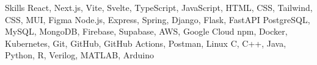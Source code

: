 
\begin{rubric}{Skills}
    React, Next.js, Vite, Svelte, TypeScript, JavaScript, HTML, CSS, Tailwind, CSS, MUI, Figma
    Node.js, Express, Spring, Django, Flask, FastAPI
    PostgreSQL, MySQL, MongoDB, Firebase, Supabase, AWS, Google Cloud
    npm, Docker, Kubernetes, Git, GitHub, GitHub Actions, Postman, Linux
    C, C++, Java, Python, R, Verilog, MATLAB, Arduino
\end{rubric}
